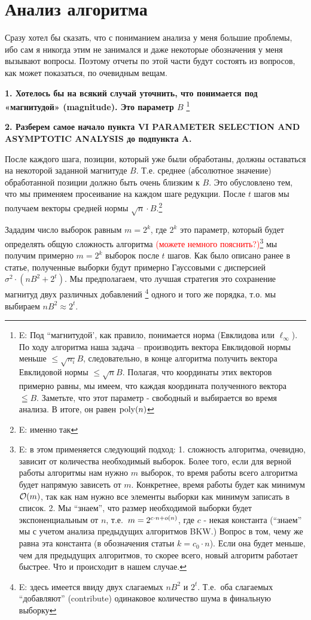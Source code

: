 \documentclass[a4paper,11pt]{article}
\begin{document}
\section{Анализ алгоритма}

Сразу хотел бы сказать, что с пониманием анализа у меня большие проблемы, ибо сам я никогда этим не занимался и даже некоторые обозначения у меня вызывают вопросы. Поэтому отчеты по этой части будут состоять из вопросов, как может показаться, по очевидным вещам.

\textbf{1. Хотелось бы на всякий случай уточнить, что понимается под «магнитудой» (magnitude). Это параметр $B$ } \footnote{E: 
Под ``магнитудой', как правило, понимается норма (Евклидова или $\ell_\infty$). По ходу алгоритма наша задача -- производить вектора  Евклидовой нормы меньше $\leq \sqrt{n_i}B$, следовательно, в конце алгоритма получить вектора Евклидовой нормы $ \leq \sqrt{n}B$. Полагая, что координаты этих векторов примерно равны, мы имеем, что каждая координата полученного вектора $\leqq B$. Заметьте, что этот параметр - свободный и выбирается во время анализа. В итоге, он равен $\mathrm{poly}(n)$
} 

\textbf{2. Разберем самое начало пункта VI PARAMETER SELECTION AND ASYMPTOTIC ANALYSIS до подпункта A.}

После каждого шага, позиции, который уже были обработаны, должны оставаться на некоторой заданной магнитуде $B$. Т.е. среднее (абсолютное значение) обработанной позиции должно быть очень близким к $B$. Это обусловлено тем, что мы применяем просеивание на каждом шаге редукции. После $t$ шагов мы получаем векторы средней нормы $\sqrt{n}\cdot B$.\footnote{E: именно так} 

Зададим число выборок равным ${m=2^k}$, где $2^k$ это параметр, который будет определять общую сложность алгоритма \textcolor{red}{(можете немного пояснить?)}\footnote{E: в этом применяется следующий подход: 1. сложность алгоритма, очевидно, зависит от количества необходимый выборок. Более того, если для верной работы алгоритмы нам нужно $m$ выборок, то время работы всего алгоритма будет напрямую зависеть от $m$. Конкретнее, время работы будет как минимум $\mathcal{O}(m)$, так как нам нужно все элементы выборки как минимум записать в список. 2. Мы ``знаем'', что размер необходимой выборки  будет экспоненциальным от $n$, т.е.\ $m = 2^{c \cdot n + o(n) }$, где $c$ - некая константа (``знаем'' мы с учетом анализа предыдущих алгоритмов BKW.) Вопрос в том, чему же равна эта константа (в обозначения статьи $k=c_0 \cdot n$). Если она будет меньше, чем для предыдущих алгоритмов, то скорее всего, новый алгоритм работает быстрее. Что и происходит в нашем случае.}
мы получим примерно $m=2^k$ выборок после $t$ шагов. Как было описано ранее в статье, полученные выборки будут примерно Гауссовыми с дисперсией $\sigma^2\cdot(nB^2+2^t)$. Мы предполагаем, что лучшая стратегия это сохранение магнитуд двух различных добавлений \footnote{E: здесь имеется ввиду двух слагаемых $nB^2$ и $2^t$. Т.е.\ оба слагаемых ``добавляют'' (contribute) одинаковое количество шума в финальную выборку} одного и того же порядка, т.о. мы выбираем $nB^2 \approx 2^t$.
\end{document}
